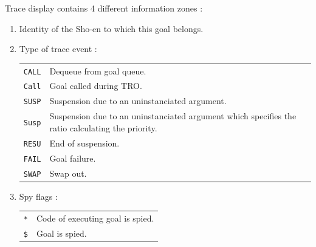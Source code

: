 Trace display contains 4 different information zones :
\vspace{2ex}\\
\hspace*{15mm}
\vspace{2ex}
\begin{enumerate}

\item Identity of the Sho-en to which this goal belongs.

\item Type of trace event :
\vspace{1ex}\\
\hspace*{15mm}\begin{tabular}{l@{ :: }p{120mm}}
\verb|CALL| & Dequeue from goal queue.\\
\verb|Call| & Goal called during TRO.\\
\verb|SUSP| & Suspension due to an uninstanciated argument.\\
\verb|Susp| & Suspension due to an uninstanciated argument
		which specifies the ratio calculating the priority.\\
\verb|RESU| & End of suspension.\\
\verb|FAIL| & Goal failure.\\
\verb|SWAP| & Swap out.\\
\end{tabular}
\vspace{1ex}

\item Spy flags :
\vspace{1ex}\\
\hspace*{15mm}\begin{tabular}{l@{ :: }p{120mm}}
\verb|*| & Code of executing goal is spied.\\
\verb|$| & Goal is spied.\\
\end{tabular}
\vspace{1ex}


\end{enumerate}
